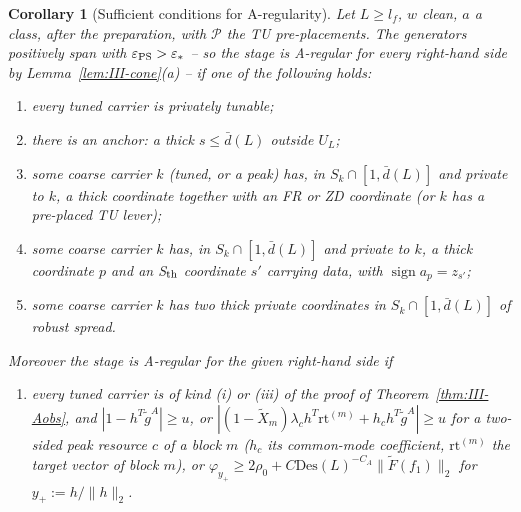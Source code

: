 \documentclass[10pt]{amsart}
\newtheorem{corollary}[theorem]{Corollary}
\theoremstyle{definition}
\theoremstyle{remark}
\newcommand{\sgn}{\operatorname{sign}}
\begin{document}
\begin{corollary}[Sufficient conditions for A-regularity]\label{cor:III-Asuff}
Let $L\ge l_f$, $w$ clean, $a$ a class, after the preparation, with $\mathcal P$
the TU pre-placements.  The generators positively span with $\varepsilon_{\rm PS}
>\varepsilon_*$ -- so the stage is A-regular for every right-hand side by
Lemma~\textup{\ref{lem:III-cone}(a)} -- if one of the following holds:
\begin{enumerate}
\item[(a)] every tuned carrier is privately tunable;
\item[(b)] there is an anchor: a thick $s\le\bar d(L)$ outside $U_L$;
\item[(c)] some coarse carrier $k$ \textup{(}tuned, or a peak\textup{)} has, in
$S_k\cap[1,\bar d(L)]$ and private to $k$, a thick coordinate together with an FR or
ZD coordinate \textup{(}or $k$ has a pre-placed TU lever\textup{)};
\item[(d)] some coarse carrier $k$ has, in $S_k\cap[1,\bar d(L)]$ and private to
$k$, a thick coordinate $p$ and an S$_{\rm th}$ coordinate $s'$ carrying data,
with $\sgn a_p=z_{s'}$;
\item[(e)] some coarse carrier $k$ has two thick private coordinates in
$S_k\cap[1,\bar d(L)]$ of robust spread.
\end{enumerate}
Moreover the stage is A-regular for the given right-hand side if
\begin{enumerate}
\item[(f)] every tuned carrier is of kind (i) or (iii) of the proof of
Theorem~\textup{\ref{thm:III-Aobs}}, and $|1-h^T\tilde g^A|\ge u$, or
$|(1-\tilde X_m)\lambda_ch^T\mathrm{rt}^{(m)}+h_ch^T\tilde g^A|\ge u$ for a two-sided
peak resource $c$ of a block $m$ \textup{(}$h_c$ its common-mode coefficient,
$\mathrm{rt}^{(m)}$ the target vector of block $m$\textup{)}, or
$\varphi_{y_+}\ge2\rho_0+C\mathrm{Des}(L)^{-C_A}\|\tilde F(f_1)\|_2$ for
$y_+:=h/\|h\|_2$.
\end{enumerate}
\end{corollary}
\end{document}
